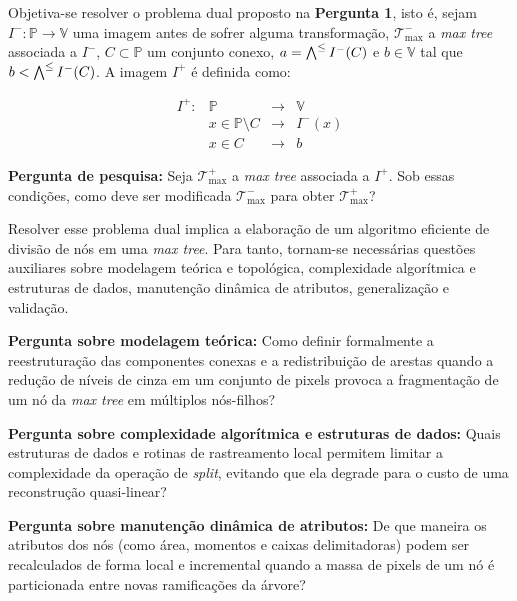 Objetiva-se resolver o problema dual proposto na \textbf{Pergunta 1}, isto é,
sejam $I^{-}: \mathbb{P} \rightarrow \mathbb{V}$ uma imagem antes de sofrer
alguma transformação, $\mathscr{T}^{-}_{\text{max}}$ a \textit{max tree} associada a $I^{-}$,
$C \subset \mathbb{P}$ um conjunto conexo, $a = \bigwedge^{\le}I^{-}(C)$ e
$b \in \mathbb{V}$ tal que $b < \bigwedge^{\le}I^{-}(C)$.
A imagem $I^{+}$ é definida como:

$$\begin{array}{|llll}
   I^{+} : & \mathbb{P} & \rightarrow & \mathbb{V}  \\
           & x \in \mathbb{P} \setminus C & \rightarrow & I^{-}(x) \\
           & x \in C & \rightarrow & b
\end{array}$$

\begin{tcolorbox}[colback=gray!15, colframe=gray!50, arc=2mm]
  \textbf{Pergunta de pesquisa:} Seja $\mathscr{T}_{\text{max}}^{+}$ a \textit{max tree} associada a $I^{+}$.
  Sob essas condições, como deve ser modificada $\mathscr{T}_{\text{max}}^{-}$
  para obter $\mathscr{T}_{\text{max}}^{+}$?
\end{tcolorbox}

Resolver esse problema dual implica a elaboração de um algoritmo eficiente de
divisão de nós em uma \textit{max tree}. Para tanto, tornam-se necessárias
questões auxiliares sobre modelagem teórica e topológica, complexidade
algorítmica e estruturas de dados, manutenção dinâmica de atributos,
generalização e validação.

\begin{tcolorbox}[colback=gray!15, colframe=gray!50, arc=2mm]
\textbf{Pergunta sobre modelagem teórica:} Como definir formalmente a
reestruturação das componentes conexas e a redistribuição de arestas quando a
redução de níveis de cinza em um conjunto de pixels provoca a fragmentação de
um nó da \textit{max tree} em múltiplos nós-filhos?
\end{tcolorbox}

\begin{tcolorbox}[colback=gray!15, colframe=gray!50, arc=2mm]
\textbf{Pergunta sobre complexidade algorítmica e estruturas de dados:}
Quais estruturas de dados e rotinas de rastreamento local permitem limitar a
complexidade da operação de \textit{split}, evitando que ela degrade para o
custo de uma reconstrução quasi-linear?
\end{tcolorbox}

\begin{tcolorbox}[colback=gray!15, colframe=gray!50, arc=2mm]
\textbf{Pergunta sobre manutenção dinâmica de atributos:}
De que maneira os atributos dos nós (como área, momentos e caixas
delimitadoras) podem ser recalculados de forma local e incremental quando a
massa de pixels de um nó é particionada entre novas ramificações da árvore?
\end{tcolorbox}

